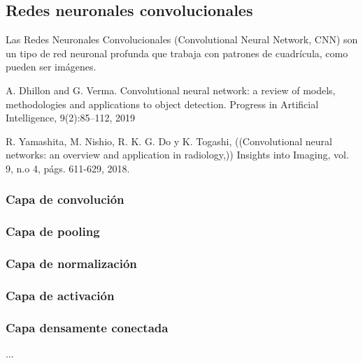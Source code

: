 \subsection{Redes neuronales convolucionales}
Las Redes Neuronales Convolucionales (Convolutional Neural Network, CNN) \cite{35, 36, 37} son un tipo de red neuronal profunda que trabaja con patrones de cuadrícula, como pueden ser imágenes.


















A. Dhillon and G. Verma. Convolutional neural network: a review of models, methodologies and applications to object detection. Progress
in Artificial Intelligence, 9(2):85–112, 2019

R. Yamashita, M. Nishio, R. K. G. Do y K. Togashi, ((Convolutional neural networks: an overview and application in radiology,)) Insights
into Imaging, vol. 9, n.o 4, págs. 611-629, 2018.

\subsubsection*{Capa de convolución}

\subsubsection*{Capa de pooling}

\subsubsection*{Capa de normalización}

\subsubsection*{Capa de activación}

\subsubsection*{Capa densamente conectada}

...

